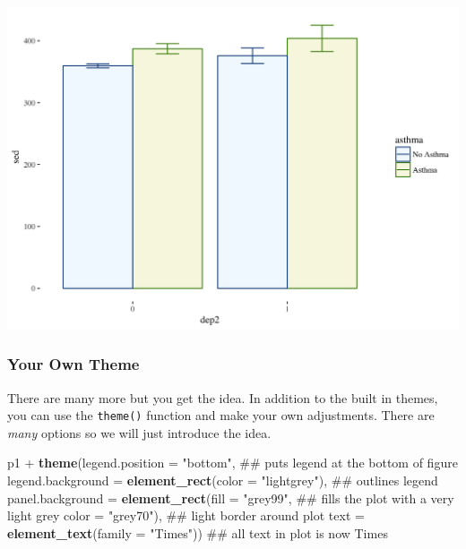 \documentclass[]{tufte-book}
\newenvironment{Shaded}{}{}
\newcommand{\KeywordTok}[1]{\textcolor[rgb]{0.00,0.44,0.13}{\textbf{#1}}}
\newcommand{\DataTypeTok}[1]{\textcolor[rgb]{0.56,0.13,0.00}{#1}}
\newcommand{\StringTok}[1]{\textcolor[rgb]{0.25,0.44,0.63}{#1}}
\newcommand{\OperatorTok}[1]{\textcolor[rgb]{0.40,0.40,0.40}{#1}}
\newcommand{\NormalTok}[1]{#1}
\theoremstyle{definition}
\theoremstyle{definition}
\theoremstyle{remark}
\begin{document}
\includegraphics{_main_files/figure-latex/unnamed-chunk-152-1}

\subsubsection*{Your Own Theme}\label{your-own-theme}

There are many more but you get the idea. In addition to the built in
themes, you can use the \texttt{theme()} function and make your own
adjustments. There are \emph{many} options so we will just introduce the
idea.

\begin{Shaded}
\begin{Highlighting}[]
\NormalTok{p1 }\OperatorTok{+}\StringTok{ }
\StringTok{  }\KeywordTok{theme}\NormalTok{(}\DataTypeTok{legend.position =} \StringTok{"bottom"}\NormalTok{,  ## puts legend at the bottom of figure}
        \DataTypeTok{legend.background =} \KeywordTok{element_rect}\NormalTok{(}\DataTypeTok{color =} \StringTok{"lightgrey"}\NormalTok{),  ## outlines legend}
        \DataTypeTok{panel.background =} \KeywordTok{element_rect}\NormalTok{(}\DataTypeTok{fill =} \StringTok{"grey99"}\NormalTok{,   ## fills the plot with a very light grey}
                                        \DataTypeTok{color =} \StringTok{"grey70"}\NormalTok{),  ## light border around plot}
        \DataTypeTok{text =} \KeywordTok{element_text}\NormalTok{(}\DataTypeTok{family =} \StringTok{"Times"}\NormalTok{))     ## all text in plot is now Times}
\end{Highlighting}
\end{Shaded}
\end{document}
